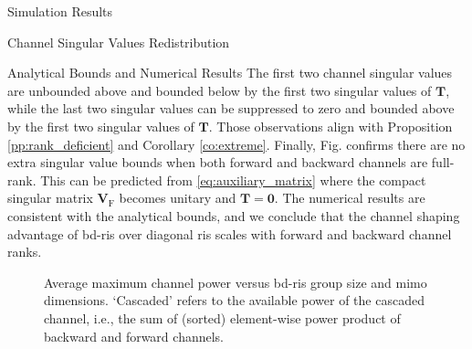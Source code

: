 \documentclass[journal]{IEEEtran}
\begin{document}
\begin{section}{Simulation Results}
\begin{subsection}{Channel Singular Values Redistribution}
\begin{subsubsection}{Analytical Bounds and Numerical Results}
			The first two channel singular values are unbounded above and bounded below by the first two singular values of $\mathbf{T}$, while the last two singular values can be suppressed to zero and bounded above by the first two singular values of $\mathbf{T}$.
			Those observations align with Proposition \ref{pp:rank_deficient} and Corollary \ref{co:extreme}.
			Finally, Fig.  confirms there are no extra singular value bounds when both forward and backward channels are full-rank.
			This can be predicted from \eqref{eq:auxiliary_matrix} where the compact singular matrix $\mathbf{V}_\mathrm{F}$ becomes unitary and $\mathbf{T}=\mathbf{0}$.
			The numerical results are consistent with the analytical bounds, and we conclude that the channel shaping advantage of \gls{bd}-\gls{ris} over diagonal \gls{ris} scales with forward and backward channel ranks.


			\begin{figure}[!t]
				\centering
				\caption{
					Average maximum channel power versus \gls{bd}-\gls{ris} group size and \gls{mimo} dimensions.
					`Cascaded' refers to the available power of the cascaded channel, i.e., the sum of (sorted) element-wise power product of backward and forward channels.
				}
				\label{fg:power_bond}
			\end{figure}


\end{subsubsection}
\end{subsection}
\end{section}
\end{document}
